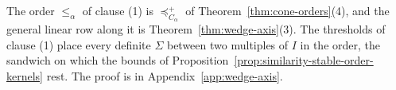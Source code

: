 The order $\le_\alpha$ of clause (1) is $\preceq^+_{C_\alpha}$ of Theorem~\ref{thm:cone-orders}(4), and the
general linear row along it is Theorem~\ref{thm:wedge-axis}(3). The thresholds of clause (1) place every
definite $\Sigma$ between two multiples of $I$ in the order, the sandwich on which the bounds of
Proposition~\ref{prop:similarity-stable-order-kernels} rest. The proof is in Appendix~\ref{app:wedge-axis}.
